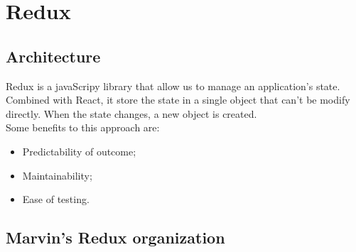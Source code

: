 \documentclass[ManualeSviluppatore.tex]{subfiles}
\begin{document}
\chapter{Redux}
\section{Architecture}
Redux is a javaScripy library that allow us to manage an application's state. \\ 
Combined with React, it store the state in a single object that can't be modify directly. When the state changes, a new object is created. \\
Some benefits to this approach are:
\begin{itemize}
	\item Predictability of outcome;
	\item Maintainability;
	\item Ease of testing.
\end{itemize}

\section{Marvin's Redux organization} %
	
	\newpage
	
	\newpage
	
	\newpage
	
	\newpage	
	
\end{document}
